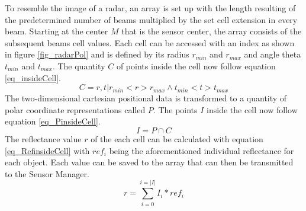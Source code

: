 To resemble the image of a radar, an array  is set up with the length resulting of the predetermined number of beams multiplied by the set cell extension in every beam. Starting at the center $M$ that is the sensor center, the array consists of the subsequent beams cell values. Each cell can be accessed with an index as shown in figure \ref{fig_radarPol} and is defined by its radius $r_{min}$ and $r_{max}$ and angle theta $t_{min}$ and $t_{max}$. The quantity $C$ of points inside the cell now follow equation \ref{eq_insideCell}. 
\begin{equation}
C = {r,t| r_{min}<r>r_{max} \wedge t_{min}<t>t_{max}}
\label{eq_insideCell}
\end{equation}
 The two-dimensional cartesian positional data is transformed to a quantity of polar coordinate representations called $P$. The points $I$ inside the cell now follow equation \ref{eq_PinsideCell}. 
\begin{equation}
	I = P \cap C
\label{eq_PinsideCell}
\end{equation}
The reflectance value $r$ of the each cell can be calculated with equation \ref{eq_RefinsideCell} with $ref_i$ being the aforementioned individual reflectance for each object. Each value can be saved to the array that can then be transmitted to the Sensor Manager.\\
\begin{equation}
r = \sum_{i=0}^{i=|I|} I_i * ref_i
\label{eq_RefinsideCell}
\end{equation}


